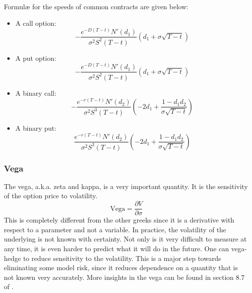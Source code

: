 Formul{\ae} for the speeds of common contracts are given below:
\begin{itemize}
	\setlength\itemsep{0em}
	\item A call option:
	\begin{equation}
		-\frac{e^{-D(T-t)} N'(d_1)}{\sigma^2 S^2 (T-t)} \left( d_1 + \sigma \sqrt{T-t} \right)
	\end{equation}
	\item A put option:
	\begin{equation}
		-\frac{e^{-D(T-t)} N'(d_1)}{\sigma^2 S^2 (T-t)} \left( d_1 + \sigma \sqrt{T-t} \right)
	\end{equation}
	\item A binary call:
	\begin{equation}
		-\frac{e^{-r(T-t)} N'(d_2)}{\sigma^2 S^3 (T-t)} \left( -2d_1 + \frac{1 - d_1 d_2}{\sigma \sqrt{T-t}} \right)
	\end{equation}
	\item A binary put:
	\begin{equation}
	 	\frac{e^{-r(T-t)} N'(d_2)}{\sigma^2 S^3 (T-t)} \left( -2d_1 + \frac{1 - d_1 d_2}{\sigma \sqrt{T-t}} \right)
	\end{equation}
\end{itemize}


\subsubsection{Vega}
The vega, a.k.a. zeta and kappa, is a very important quantity. It is the sensitivity of the option price to volatility.
\begin{equation}
    \text{Vega} = \frac{\partial V}{\partial \sigma}
\end{equation}
This is completely different from the other greeks since it is a derivative with respect to a parameter and not a variable. In practice, the volatility of the underlying is not known with certainty. Not only is it very difficult to measure at any time, it is even harder to predict what it will do in the future. One can vega-hedge to reduce sensitivity to the volatility. This is a major step towards eliminating some model risk, since it reduces dependence on a quantity that is not known very accurately. More insights in the vega can be found in section 8.7 of \cite{pw_iqf2ed_2007}.

